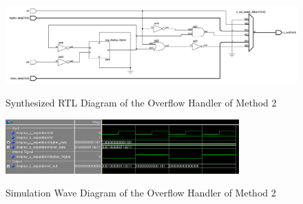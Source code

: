 \begin{figure}[!ht]
	\centering
	\caption{Synthesized RTL Diagram of the Overflow Handler of Method 2}
	\includegraphics[width=\textwidth]{../img/sep_display_rtl.png}
	\label{fig:sep_display_rtl}
\end{figure}

\begin{figure}[!ht]
	\centering
	\caption{Simulation Wave Diagram of the Overflow Handler of Method 2}
	\includegraphics[width=0.8\textwidth]{../img/sep_display_sim.png}
	\label{fig:sep_display_sim}
\end{figure}